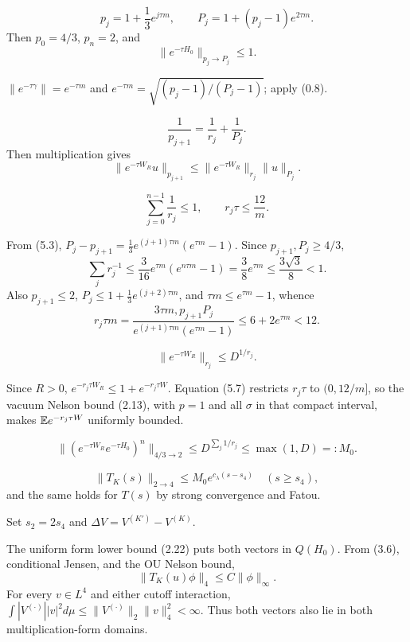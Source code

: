 \documentclass[11pt,a4paper]{article}
\begin{document}
\[
 p_j=1+\frac13e^{j\tau m},\qquad
 P_j=1+(p_j-1)e^{2\tau m}.
\tag{5.3}
\]
Then $p_0=4/3$, $p_n=2$, and
\[
 \|e^{-\tau H_0}\|_{p_j\to P_j}\le1.
\tag{5.4}
\]

\Because $\|e^{-\tau\gamma}\|=e^{-\tau m}$ and
$e^{-\tau m}=\sqrt{(p_j-1)/(P_j-1)}$; apply (0.8).

\[
 \frac1{p_{j+1}}=\frac1{r_j}+\frac1{P_j}.
\tag{5.5}
\]
Then multiplication gives
\[
 \|e^{-\tau W_R}u\|_{p_{j+1}}
 \le\|e^{-\tau W_R}\|_{r_j}\|u\|_{P_j}.
\tag{5.6}
\]

\[
 \sum_{j=0}^{n-1}\frac1{r_j}\le1,\qquad
 r_j\tau\le\frac{12}{m}.
\tag{5.7}
\]

\Because From (5.3),
$P_j-p_{j+1}=\tfrac13e^{(j+1)\tau m}(e^{\tau m}-1)$.  Since
$p_{j+1},P_j\ge4/3$,
\[
 \sum_jr_j^{-1}
 \le\frac3{16}e^{\tau m}(e^{n\tau m}-1)
 =\frac38e^{\tau m}\le\frac{3\sqrt3}{8}<1.
\]
Also $p_{j+1}\le2$, $P_j\le1+\tfrac13e^{(j+2)\tau m}$, and
$\tau m\le e^{\tau m}-1$, whence
\[
 r_j\tau m
 =\frac{3\tau m,p_{j+1}P_j}
 {e^{(j+1)\tau m}(e^{\tau m}-1)}
 \le6+2e^{\tau m}<12.
\]

\[
 \|e^{-\tau W_R}\|_{r_j}\le D^{1/r_j}.
\tag{5.8}
\]

\Because Since $R>0$, $e^{-r_j\tau W_R}\le1+e^{-r_j\tau W}$.
Equation (5.7) restricts $r_j\tau$ to $(0,12/m]$, so the vacuum Nelson
bound (2.13), with $p=1$ and all $\sigma$ in that compact interval, makes
$\mathbb E e^{-r_j\tau W}$ uniformly bounded.

\[
 \|(e^{-\tau W_R}e^{-\tau H_0})^n\|_{4/3\to2}
 \le D^{\sum_j1/r_j}\le\max(1,D)=:M_0.
\tag{5.9}
\]

\[
 \|T_K(s)\|_{2\to4}\le M_0e^{c_\lambda(s-s_4)}\quad(s\ge s_4),
\tag{5.10}
\]
and the same holds for $T(s)$ by strong convergence and Fatou.

\QedStep


Set $s_2=2s_4$ and $\Delta V=V^{(K')}-V^{(K)}$.


\Because The uniform form lower bound (2.22) puts both vectors in $Q(H_0)$.
From (3.6), conditional Jensen, and the OU Nelson bound,
\[
 \|T_K(u)\phi\|_4\le C\|\phi\|_\infty.
\]
For every $v\in L^4$ and either cutoff interaction,
$\int|V^{(\cdot)}||v|^2d\mu\le\|V^{(\cdot)}\|_2\|v\|_4^2<\infty$.
Thus both vectors also lie in both multiplication-form domains.
\end{document}
